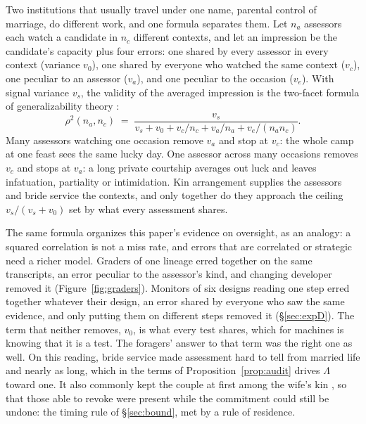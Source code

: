 \documentclass[10pt,twocolumn]{article}
\theoremstyle{plain}
\theoremstyle{definition}
\begin{document}
Two institutions that usually travel under one name, parental control of marriage, do
different work, and one formula separates them. Let $n_a$ assessors each watch a candidate in
$n_c$ different contexts, and let an impression be the candidate's capacity plus four
errors: one shared by every assessor in every context (variance $v_0$), one shared by
everyone who watched the same context ($v_c$), one peculiar to an assessor ($v_a$), and one
peculiar to the occasion ($v_e$). With signal variance $v_s$, the validity of the averaged
impression is the two-facet formula of generalizability theory \cite{cronbach1972}:
\[
\rho^{2}(n_a,n_c)\;=\;\frac{v_s}{v_s+v_0+v_c/n_c+v_a/n_a+v_e/(n_a n_c)}.
\]
Many assessors watching one occasion remove $v_a$ and stop at $v_c$: the whole camp at one
feast sees the same lucky day. One assessor across many occasions removes $v_c$ and stops at
$v_a$: a long private courtship averages out luck and leaves infatuation, partiality or
intimidation. Kin arrangement supplies the assessors and bride service the contexts, and only
together do they approach the ceiling $v_s/(v_s+v_0)$ set by what every assessment shares.

The same formula organizes this paper's evidence on oversight, as an analogy: a squared
correlation is not a miss rate, and errors that are correlated or strategic need a richer
model. Graders of one lineage erred
together on the same transcripts, an error peculiar to the assessor's kind, and changing
developer removed it (Figure~\ref{fig:graders}). Monitors of six designs reading one step
erred together whatever their design, an error shared by everyone who saw the same evidence,
and only putting them on different steps removed it (\S\ref{sec:expD}). The term that neither
removes, $v_0$, is what every test shares, which for machines is knowing that it is a test.
The foragers' answer to that term was the right one as well. On this reading, bride service
made assessment hard to tell from married life and nearly as long, which in the terms of
Proposition~\ref{prop:audit} drives $\Lambda$ toward one. It also commonly kept the couple
at first among the wife's kin \cite{marlowe2004}, so that those able to revoke were present
while the commitment could still be undone: the timing rule of \S\ref{sec:bound}, met by a
rule of residence.
\end{document}
